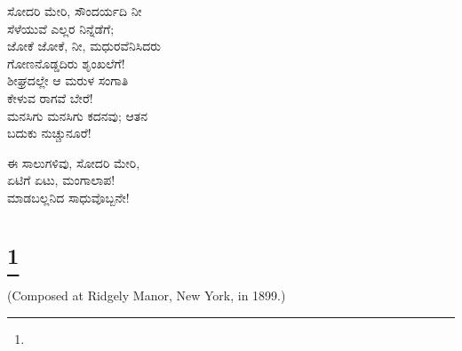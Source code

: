 \begin{myquote}
ಸೋದರಿ ಮೇರಿ, ಸೌಂದರ್ಯದಿ ನೀ\\ಸೆಳೆಯುವೆ ಎಲ್ಲರ ನಿನ್ನೆಡೆಗೆ;\\ಜೋಕೆ ಜೋಕೆ, ನೀ, ಮಧುರವೆನಿಸಿದರು\\ಗೋಣನೊಡ್ಡದಿರು ಶೃಂಖಲೆಗೆ!\\ಶೀಘ್ರದಲ್ಲೇ ಆ ಮರುಳ ಸಂಗಾತಿ\\ಕೇಳುವ ರಾಗವೆ ಬೇರೆ!\\ಮನಸಿಗು ಮನಸಿಗು ಕದನವು; ಆತನ\\ಬದುಕು ನುಚ್ಚುನೂರೆ!
\end{myquote}

\begin{myquote}
ಈ ಸಾಲುಗಳಿವು, ಸೋದರಿ ಮೇರಿ,\\ಏಟಿಗೆ ಏಟು, ಮಂಗಾಲಾಪ!\\ಮಾಡಬಲ್ಲನಿದ ಸಾಧುವೊಬ್ಬನೇ!
\end{myquote}

\selecteng

\chapter[TO MY OWN SOUL]{\protect\footnote{}}

\begin{center}
(Composed at Ridgely Manor, New York, in 1899.)
\end{center}

\begin{myquote}
\end{myquote}

\begin{myquote}
\end{myquote}

\begin{myquote}
\end{myquote}


